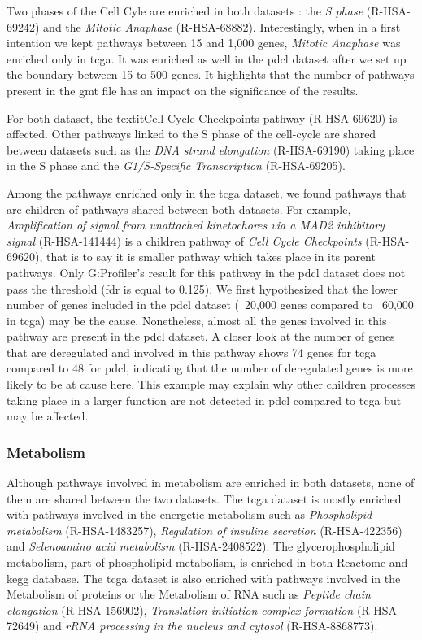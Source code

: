 Two phases of the Cell Cyle are enriched in both datasets : the \textit{S phase} (R-HSA-69242) and the \textit{Mitotic Anaphase} (R-HSA-68882).
Interestingly, when in a first intention we kept pathways between 15 and 1,000 genes, \textit{Mitotic Anaphase}  was enriched only in \acrshort{tcga}.
It was enriched as well in the \acrshort{pdcl} dataset after we set up the boundary between 15 to 500 genes.
It highlights that the number of pathways present in the \acrshort{gmt} file has an impact on the significance of the results.

For both dataset, the textit{Cell Cycle Checkpoints} pathway (R-HSA-69620) is affected.
Other pathways linked to the S phase of the cell-cycle are shared between datasets such as the \textit{DNA strand elongation} (R-HSA-69190) taking place in the S phase and the \textit{G1/S-Specific Transcription} (R-HSA-69205).

Among the pathways enriched only in the \acrshort{tcga} dataset, we found pathways that are children of pathways shared between both datasets.
For example, \textit{Amplification of signal from unattached kinetochores via a MAD2 inhibitory signal} (R-HSA-141444) is a children pathway of \textit{Cell Cycle Checkpoints} (R-HSA-69620), that is to say it is smaller pathway which takes place in its parent pathways.
Only G:Profiler's result for this pathway in the \acrshort{pdcl} dataset does not pass the threshold (\acrshort{fdr} is equal to 0.125).
We first hypothesized that the lower number of genes included in the \acrshort{pdcl} dataset (~20,000 genes compared to ~60,000 in \acrshort{tcga}) may be the cause.
Nonetheless, almost all the genes involved in this pathway are present in the \acrshort{pdcl} dataset.
A closer look at the number of genes that are deregulated and involved in this pathway shows 74 genes for \acrshort{tcga} compared to 48 for \acrshort{pdcl}, indicating that the number of deregulated genes is more likely to be at cause here.
This example may explain why other children processes taking place in a larger function are not detected in \acrshort{pdcl} compared to \acrshort{tcga} but may be affected.

\subsubsection{Metabolism}

Although pathways involved in metabolism are enriched in both datasets, none of them are shared between the two datasets.
The \acrshort{tcga} dataset is mostly enriched with pathways involved in the energetic metabolism such as \textit{Phospholipid metabolism} (R-HSA-1483257), \textit{Regulation of insuline secretion} (R-HSA-422356) and \textit{Selenoamino acid metabolism} (R-HSA-2408522).
The glycerophospholipid metabolism, part of phospholipid metabolism, is enriched in both Reactome and \acrshort{kegg} database.
The \acrshort{tcga} dataset is also enriched with pathways involved in the Metabolism of proteins or the Metabolism of RNA such as \textit{Peptide chain elongation} (R-HSA-156902), \textit{Translation initiation complex formation} (R-HSA-72649) and \textit{rRNA processing in the nucleus and cytosol} (R-HSA-8868773).

